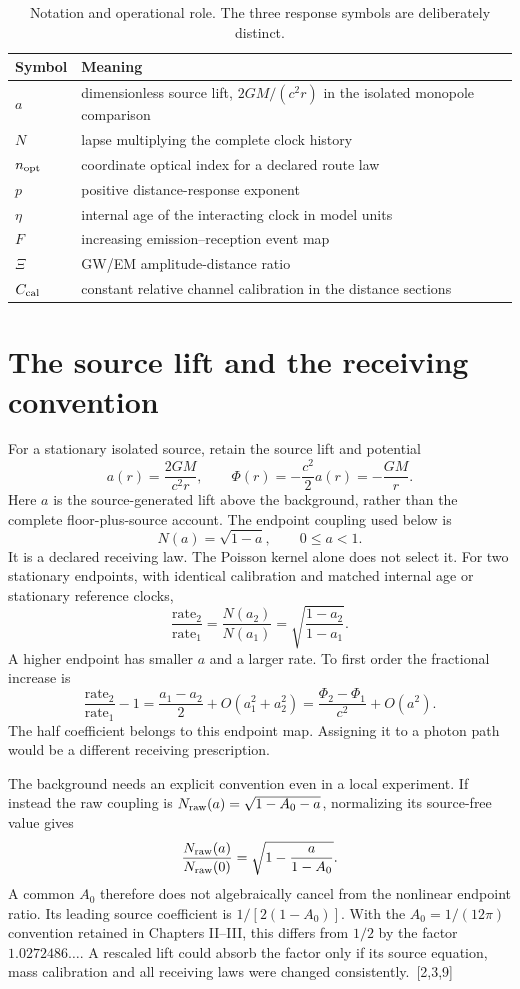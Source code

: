 \documentclass[10pt,twocolumn,letterpaper]{article}
\begin{document}
\begin{table}[htbp]\centering\small
\caption{Notation and operational role. The three response symbols are deliberately distinct.}
\begin{tabularx}{\columnwidth}{@{}l>{\raggedright\arraybackslash}X@{}}\toprule
Symbol & Meaning\\\midrule
$a$ & dimensionless source lift, $2GM/(c^2r)$ in the isolated monopole comparison\\
$N$ & lapse multiplying the complete clock history\\
$n_{\rm opt}$ & coordinate optical index for a declared route law\\
$p$ & positive distance-response exponent\\
$\eta$ & internal age of the interacting clock in model units\\
$F$ & increasing emission--reception event map\\
$\Xi$ & GW/EM amplitude-distance ratio\\
$C_{\rm cal}$ & constant relative channel calibration in the distance sections\\\bottomrule
\end{tabularx}\end{table}

\section{The source lift and the receiving convention}


For a stationary isolated source, retain the source lift and potential
\[
 a(r)=\frac{2GM}{c^2r},\qquad \Phi(r)=-\frac{c^2}{2}a(r)=-\frac{GM}{r}.
\]
Here $a$ is the source-generated lift above the background, rather than the complete floor-plus-source account. The endpoint coupling used below is
\[
 N(a)=\sqrt{1-a},\qquad 0\leq a<1.
\]
It is a declared receiving law. The Poisson kernel alone does not select it. For two stationary endpoints, with identical calibration and matched internal age or stationary reference clocks,
\[
 \frac{\text{rate}_2}{\text{rate}_1}
 =\frac{N(a_2)}{N(a_1)}
 =\sqrt{\frac{1-a_2}{1-a_1}}.
\]
A higher endpoint has smaller $a$ and a larger rate. To first order the fractional increase is
\[
 \frac{\text{rate}_2}{\text{rate}_1}-1
 =\frac{a_1-a_2}{2}+O(a_1^2+a_2^2)
 =\frac{\Phi_2-\Phi_1}{c^2}+O(a^2).
\]
The half coefficient belongs to this endpoint map. Assigning it to a photon path would be a different receiving prescription.

The background needs an explicit convention even in a local experiment. If instead the raw coupling is $N_{\rm raw}(a)=\sqrt{1-A_0-a}$, normalizing its source-free value gives
\[
 \frac{N_{\rm raw}(a)}{N_{\rm raw}(0)}
 =\sqrt{1-\frac{a}{1-A_0}}.
\]
A common $A_0$ therefore does not algebraically cancel from the nonlinear endpoint ratio. Its leading source coefficient is $1/[2(1-A_0)]$. With the $A_0=1/(12\pi)$ convention retained in Chapters II--III, this differs from $1/2$ by the factor $1.0272486\ldots$. A rescaled lift could absorb the factor only if its source equation, mass calibration and all receiving laws were changed consistently.~[2,3,9]
\end{document}
